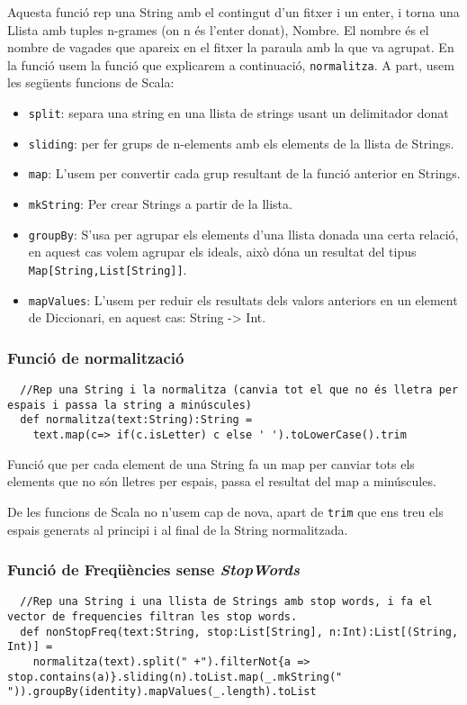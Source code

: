 \documentclass[11pt,a4paper,twoside]{report}
\begin{document}
Aquesta funció rep una String amb el contingut d'un fitxer i un enter, i torna una Llista amb tuples n-grames (on n és l'enter donat), Nombre. El nombre és el nombre de vagades que apareix en el fitxer la paraula amb la que va agrupat.
En la funció usem la funció que explicarem a continuació, \texttt{normalitza}. A part, usem les següents funcions de Scala:
\begin{itemize}
  \item \texttt{split}: separa una string en una llista de strings usant un delimitador donat
  \item \texttt{sliding}: per fer grups de n-elements amb els elements de la llista de Strings.
  \item \texttt{map}: L'usem per convertir cada grup resultant de la funció anterior en Strings.
  \item \texttt{mkString}: Per crear Strings a partir de la llista.
  \item \texttt{groupBy}: S'usa per agrupar els elements d'una llista donada una certa relació, en aquest cas volem agrupar els ideals,
    això dóna un resultat del tipus \texttt{Map[String,List[String]]}.
  \item \texttt{mapValues}: L'usem per reduir els resultats dels valors anteriors en un element de Diccionari, en aquest cas: String -> Int.
\end{itemize}

\subsubsection*{Funció de normalització}
\begin{lstlisting}
  //Rep una String i la normalitza (canvia tot el que no és lletra per espais i passa la string a minúscules)
  def normalitza(text:String):String =
    text.map(c=> if(c.isLetter) c else ' ').toLowerCase().trim
\end{lstlisting}

Funció que per cada element de una String fa un map per canviar tots els elements que no són lletres per espais, passa el resultat del map a minúscules.

De les funcions de Scala no n'usem cap de nova, apart de \texttt{trim} que ens treu els espais generats al principi i al final de la String normalitzada.

\subsubsection*{Funció de Freqüències sense \textit{StopWords}}
\begin{lstlisting}
  //Rep una String i una llista de Strings amb stop words, i fa el vector de frequencies filtran les stop words.
  def nonStopFreq(text:String, stop:List[String], n:Int):List[(String, Int)] =
    normalitza(text).split(" +").filterNot{a => stop.contains(a)}.sliding(n).toList.map(_.mkString(" ")).groupBy(identity).mapValues(_.length).toList
\end{lstlisting}
\end{document}
